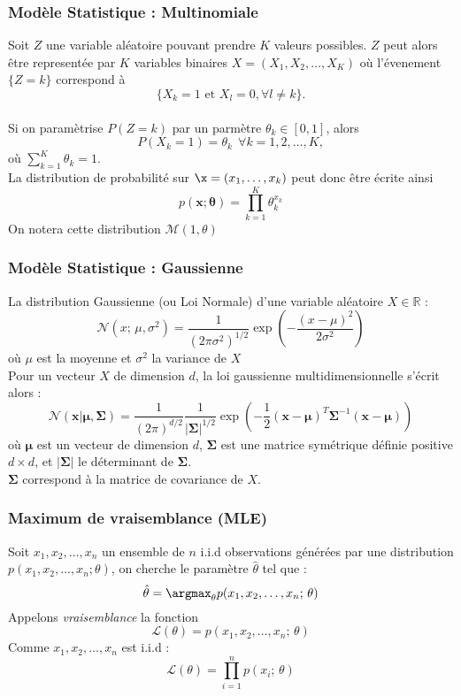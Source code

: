 \begin{frame}
  \frametitle{Modèle Statistique : Multinomiale}
    Soit $Z$ une variable aléatoire pouvant prendre $K$ valeurs possibles. $Z$ peut alors être representée par $K$ variables binaires $X=(X_1,X_2,\ldots,X_K)$ où l'évenement $\{Z=k\}$ correspond à $$\{X_k=1 \text{ et } X_l=0, \forall l \neq k\}.$$ \\
    Si on paramètrise $P(Z=k)$ par un parmètre $\theta_k \in [0,1]$, alors 
    $$P(X_k=1) = \theta_k \ \ \forall k=1,2,\ldots,K,$$
    où $\sum_{k=1}^K \theta_k=1$. \\
    La distribution de probabilité sur $\x=(x_1,\ldots, x_k)$ peut donc être écrite ainsi
    $$p(\mathbf{x};\bm{\theta})=\prod_{k=1}^K\theta_k^{x_k}$$
    On notera cette distribution $\mathcal{M}(1,\theta)$ 
\end{frame}

\begin{frame}
  \frametitle{Modèle Statistique : Gaussienne}
  La distribution Gaussienne (ou Loi Normale) d'une variable aléatoire $X \in \mathbb{R}$ :
    \[
    \mathcal{N}(x; \, \mu,\sigma^2)=\frac{1}{(2\pi\sigma^2)^{1/2}}\exp\left(-\frac{(x-\mu)^2}{2\sigma^2}\right)
    \]
    où $\mu$ est la moyenne et $\sigma^2$ la variance de $X$ \\
    \newline
    Pour un vecteur $X$ de dimension $d$, la loi gaussienne multidimensionnelle s'écrit alors :
    \[
    \mathcal{N}(\mathbf{x}|\bm{\mu},\bm{\Sigma})=\frac{1}{(2\pi)^{d/2}}\frac{1}{|\bm{\Sigma}|^{1/2}}\exp\left(-\frac{1}{2}(\mathbf{x}-\bm{\mu})^T\bm{\Sigma}^{-1}(\mathbf{x}-\bm{\mu})\right)
    \]
    où $\bm{\mu}$ est un vecteur de dimension $d$, $\bm{\Sigma}$ est une matrice symétrique définie positive $d\times d$, et $|\bm{\Sigma}|$ le déterminant de $\bm{\Sigma}$. \\
    $\bm{\Sigma}$ correspond à la matrice de covariance de $X$.
\end{frame}

\begin{frame}
  \frametitle{Maximum de vraisemblance (MLE)}
  Soit $x_1,x_2,\ldots,x_n$ un ensemble de $n$ i.i.d observations générées par une distribution $p(x_1,x_2,\ldots,x_n;\theta)$, on cherche le paramètre $\hat{\theta}$ tel que :
  $$\hat{\theta} = \argmax_\theta p(x_1,x_2,\ldots,x_n; \, \theta)$$
  Appelons \textit{vraisemblance} la fonction
  $$\mathcal{L}(\theta) = p(x_1,x_2,\ldots,x_n; \, \theta)$$
  Comme $x_1,x_2,\ldots,x_n$ est i.i.d :
  $$\mathcal{L}(\theta) = \prod_{i=1}^n p(x_i; \, \theta)$$
\end{frame}

